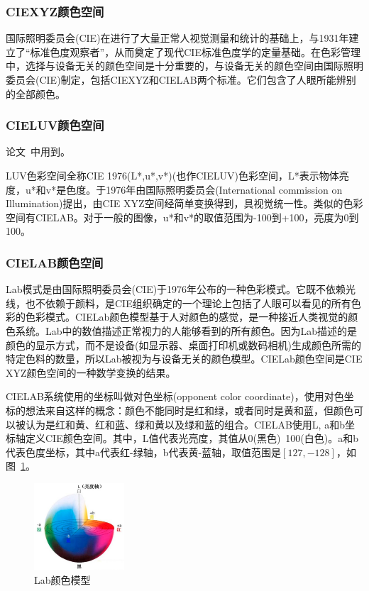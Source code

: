 \documentclass[12pt]{article}
\begin{document}
\subsubsection{CIEXYZ颜色空间}

国际照明委员会(CIE)在进行了大量正常人视觉测量和统计的基础上，与1931年建立了“标准色度观察者”，从而奠定了现代CIE标准色度学的定量基础。在色彩管理中，选择与设备无关的颜色空间是十分重要的，与设备无关的颜色空间由国际照明委员会(CIE)制定，包括CIEXYZ和CIELAB两个标准。它们包含了人眼所能辨别的全部颜色。

\subsubsection{CIELUV颜色空间}

论文~\cite{ma2003contrast}中用到。

LUV色彩空间全称CIE 1976(L*,u*,v*)(也作CIELUV)色彩空间，L*表示物体亮度，u*和v*是色度。于1976年由国际照明委员会(International commission on Illumination)提出，由CIE XYZ空间经简单变换得到，具视觉统一性。类似的色彩空间有CIELAB。对于一般的图像，u*和v*的取值范围为-100到+100，亮度为0到100。

\subsubsection{CIELAB颜色空间}

Lab模式是由国际照明委员会(CIE)于1976年公布的一种色彩模式。它既不依赖光线，也不依赖于颜料，是CIE组织确定的一个理论上包括了人眼可以看见的所有色彩的色彩模式。CIELab颜色模型基于人对颜色的感觉，是一种接近人类视觉的颜色系统。Lab中的数值描述正常视力的人能够看到的所有颜色。因为Lab描述的是颜色的显示方式，而不是设备(如显示器、桌面打印机或数码相机)生成颜色所需的特定色料的数量，所以Lab被视为与设备无关的颜色模型。CIELab颜色空间是CIE XYZ颜色空间的一种数学变换的结果。

CIELAB系统使用的坐标叫做对色坐标(opponent color coordinate)，使用对色坐标的想法来自这样的概念：颜色不能同时是红和绿，或者同时是黄和蓝，但颜色可以被认为是红和黄、红和蓝、绿和黄以及绿和蓝的组合。CIELAB使用L, a和b坐标轴定义CIE颜色空间。其中，L值代表光亮度，其值从0(黑色)~100(白色)。a和b代表色度坐标，其中a代表红-绿轴，b代表黄-蓝轴，取值范围是$[127, -128]$，如图~\ref{fig: Lab}。
\begin{figure}[!ht]
\centering
\includegraphics[width=0.3\textwidth]{Lab.png}
\caption{Lab颜色模型}
\label{fig: Lab}
\end{figure} 
\end{document}
